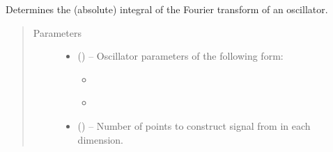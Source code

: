 \documentclass[letterpaper,10pt,english]{sphinxmanual}
\begin{document}

\begin{fulllineitems}
\label{\detokenize{references/sig:nmrespy.sig.oscillator_integral}}
\sphinxAtStartPar
Determines the (absolute) integral of the Fourier transform of
an oscillator.
\begin{quote}\begin{description}
\item[{Parameters}] \leavevmode\begin{itemize}
\item {} 
\sphinxAtStartPar
{} () – 
\sphinxAtStartPar
Oscillator parameters of the following form:
\begin{itemize}
\item {} 
\sphinxAtStartPar
{}

\begin{sphinxVerbatim}[commandchars=\\\{\}]
  \PYG{p}{[}   \PYG{p}{]}
\end{sphinxVerbatim}

\item {} 
\sphinxAtStartPar
{}

\begin{sphinxVerbatim}[commandchars=\\\{\}]
  \PYG{p}{[}     \PYG{p}{]}
\end{sphinxVerbatim}

\end{itemize}


\item {} 
\sphinxAtStartPar
{} (\sphinxstyleliteralemphasis{\sphinxupquote{{[}}}\sphinxstyleliteralemphasis{\sphinxupquote{{]}}}\sphinxstyleliteralemphasis{\sphinxupquote{, }}\sphinxstyleliteralemphasis{\sphinxupquote{{[}}}\sphinxstyleliteralemphasis{\sphinxupquote{, }}\sphinxstyleliteralemphasis{\sphinxupquote{{]}}}) – Number of points to construct signal from in each dimension.


\end{itemize}
\end{description}
\end{quote}
\end{fulllineitems}
\end{document}
